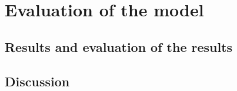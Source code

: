 

\section{Evaluation of the model}

\subsection{Results and evaluation of the results}

\subsection{Discussion}


